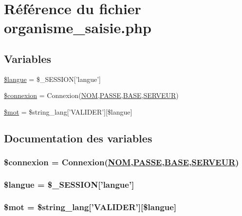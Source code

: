 \hypertarget{organisme__saisie_8php}{
\section{R\'{e}f\'{e}rence du fichier organisme\_\-saisie.php}
\label{organisme__saisie_8php}
}
\subsection*{Variables}
\begin{CompactItemize}
\item 
\hyperlink{organisme__saisie_8php_a0}{\$langue} = \$\_\-SESSION\mbox{[}'langue'\mbox{]}
\item 
\hyperlink{organisme__saisie_8php_a1}{\$connexion} = Connexion(\hyperlink{pma__connect_8php_a0}{NOM},\hyperlink{pma__connect_8php_a1}{PASSE},\hyperlink{pma__connect_8php_a3}{BASE},\hyperlink{pma__connect_8php_a2}{SERVEUR})
\item 
\hyperlink{organisme__saisie_8php_a2}{\$mot} = \$string\_\-lang\mbox{[}'VALIDER'\mbox{]}\mbox{[}\$langue\mbox{]}
\end{CompactItemize}


\subsection{Documentation des variables}
\hypertarget{organisme__saisie_8php_a1}{
\subsubsection[\$connexion]{\setlength{\rightskip}{0pt plus 5cm}\$connexion = Connexion(\hyperlink{pma__connect_8php_a0}{NOM},\hyperlink{pma__connect_8php_a1}{PASSE},\hyperlink{pma__connect_8php_a3}{BASE},\hyperlink{pma__connect_8php_a2}{SERVEUR})}}
\label{organisme__saisie_8php_a1}


\hypertarget{organisme__saisie_8php_a0}{
\subsubsection[\$langue]{\setlength{\rightskip}{0pt plus 5cm}\$langue = \$\_\-SESSION\mbox{[}'langue'\mbox{]}}}
\label{organisme__saisie_8php_a0}


\hypertarget{organisme__saisie_8php_a2}{
\subsubsection[\$mot]{\setlength{\rightskip}{0pt plus 5cm}\$mot = \$string\_\-lang\mbox{[}'VALIDER'\mbox{]}\mbox{[}\$langue\mbox{]}}}
\label{organisme__saisie_8php_a2}


